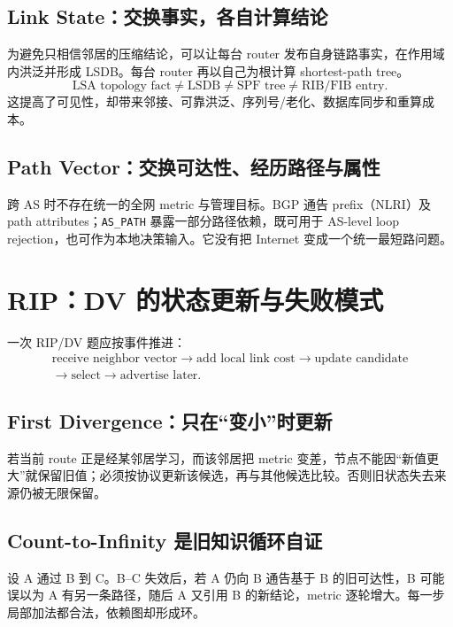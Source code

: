 \documentclass[11pt,a4paper]{ctexart}
\newcommand{\code}[1]{\texttt{#1}}
\begin{document}
\subsection{Link State：交换事实，各自计算结论}

为避免只相信邻居的压缩结论，可以让每台 router 发布自身链路事实，在作用域内洪泛并形成 LSDB。每台 router 再以自己为根计算 shortest-path tree。
\[
\boxed{\text{LSA topology fact}\ne\text{LSDB}\ne\text{SPF tree}\ne\text{RIB/FIB entry}}.
\]
这提高了可见性，却带来邻接、可靠洪泛、序列号/老化、数据库同步和重算成本。

\subsection{Path Vector：交换可达性、经历路径与属性}

跨 AS 时不存在统一的全网 metric 与管理目标。BGP 通告 prefix（NLRI）及 path attributes；\code{AS\_PATH} 暴露一部分路径依赖，既可用于 AS-level loop rejection，也可作为本地决策输入。它没有把 Internet 变成一个统一最短路问题。

\section{RIP：DV 的状态更新与失败模式}

一次 RIP/DV 题应按事件推进：
\[
\begin{gathered}
\text{receive neighbor vector}\to\text{add local link cost}\to\text{update candidate}\\
\to\text{select}\to\text{advertise later}.
\end{gathered}
\]

\subsection{First Divergence：只在“变小”时更新}

若当前 route 正是经某邻居学习，而该邻居把 metric 变差，节点不能因“新值更大”就保留旧值；必须按协议更新该候选，再与其他候选比较。否则旧状态失去来源仍被无限保留。

\subsection{Count-to-Infinity 是旧知识循环自证}

设 A 通过 B 到 C。B--C 失效后，若 A 仍向 B 通告基于 B 的旧可达性，B 可能误以为 A 有另一条路径，随后 A 又引用 B 的新结论，metric 逐轮增大。每一步局部加法都合法，依赖图却形成环。
\end{document}
